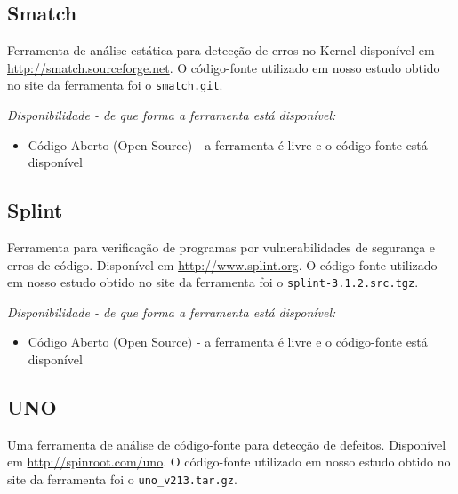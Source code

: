\subsection{Smatch}

Ferramenta de análise estática para detecção de erros no Kernel disponível em
\url{http://smatch.sourceforge.net}. O código-fonte utilizado em nosso estudo
obtido no site da ferramenta foi o \texttt{smatch.git}.

\begin{description}

  \item {\it Disponibilidade - de que forma a ferramenta está disponível:}
    \begin{itemize}
      \item Código Aberto (Open Source) - a ferramenta é livre e o código-fonte está disponível
    \end{itemize}

\end{description}

\subsection{Splint}

Ferramenta para verificação de programas por vulnerabilidades de segurança e
erros de código. Disponível em \url{http://www.splint.org}. O código-fonte
utilizado em nosso estudo obtido no site da ferramenta foi o
\texttt{splint-3.1.2.src.tgz}.

\begin{description}

  \item {\it Disponibilidade - de que forma a ferramenta está disponível:}
    \begin{itemize}
      \item Código Aberto (Open Source) - a ferramenta é livre e o código-fonte está disponível
    \end{itemize}

\end{description}

\subsection{UNO}

Uma ferramenta de análise de código-fonte para detecção de defeitos.
Disponível em \url{http://spinroot.com/uno}. O código-fonte utilizado em nosso
estudo obtido no site da ferramenta foi o \texttt{uno\_v213.tar.gz}.

